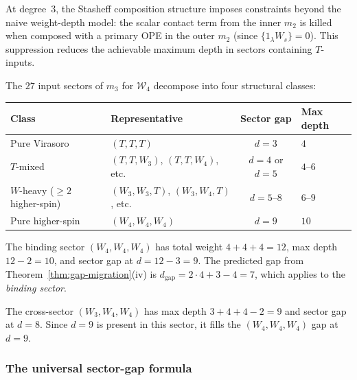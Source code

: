 At degree~$3$, the Stasheff composition structure imposes
constraints beyond the naive weight-depth model: the scalar
contact term from the inner $m_2$ is killed when composed
with a primary OPE in the outer $m_2$
(since $\{1_\lambda W_s\} = 0$). This suppression
reduces the achievable maximum depth in sectors containing
$T$-inputs.

\begin{computation}
\label{comp:w4-depth-degree-3}
%
The $27$ input sectors of $m_3$ for $\mathcal{W}_4$
decompose into four structural classes:

\begin{center}
\small
\renewcommand{\arraystretch}{1.3}
\begin{tabular}{llcl}
\toprule
\textbf{Class} & \textbf{Representative}
 & \textbf{Sector gap} & \textbf{Max depth} \\
\midrule
Pure Virasoro & $(T,T,T)$
 & $d = 3$ & $4$ \\
$T$-mixed & $(T,T,W_3)$, $(T,T,W_4)$, etc.
 & $d = 4$ or $d = 5$ & $4$--$6$ \\
$W$-heavy ($\ge 2$ higher-spin)
 & $(W_3,W_3,T)$, $(W_3,W_4,T)$, etc.
 & $d = 5$--$8$ & $6$--$9$ \\
Pure higher-spin
 & $(W_4,W_4,W_4)$
 & $d = 9$ & $10$ \\
\bottomrule
\end{tabular}
\end{center}

\noindent
The binding sector $(W_4, W_4, W_4)$ has total weight
$4 + 4 + 4 = 12$, max depth $12 - 2 = 10$, and sector gap
at $d = 12 - 3 = 9$. The predicted gap from
Theorem~\textup{\ref{thm:gap-migration}(iv)} is
$d_{\mathrm{gap}} = 2 \cdot 4 + 3 - 4 = 7$, which applies
to the \emph{binding sector}.

The cross-sector $(W_3, W_4, W_4)$ has max depth
$3 + 4 + 4 - 2 = 9$ and sector gap at $d = 8$. Since
$d = 9$ is present in this sector, it fills the
$(W_4, W_4, W_4)$ gap at $d = 9$.
\end{computation}

\subsubsection{The universal sector-gap formula}

